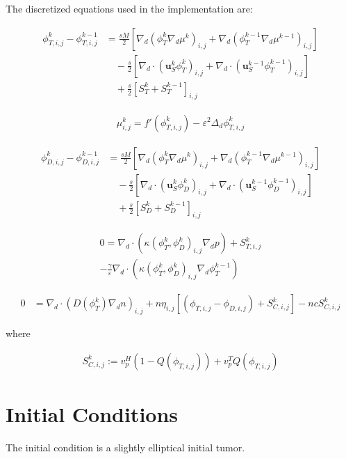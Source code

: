 \documentclass[12pt]{article}
\begin{document}
The discretized equations used in the implementation are:

\begin{align}
    \phi_{T,i,j}^{k} - \phi_{T,i,j}^{k-1} &= \frac{sM}{2} \left[\nabla_d (\phi_T^k \nabla_d \mu^k)_{i,j} + \nabla_d (\phi_T^{k-1} \nabla_d \mu^{k-1})_{i,j} \right] \nonumber \\
    &\quad - \frac{s}{2} \left[\nabla_d \cdot (\mathbf{u}_S^k \phi_T^k)_{i,j} + \nabla_d \cdot (\mathbf{u}_S^{k-1} \phi_T^{k-1})_{i,j} \right] \nonumber \\
    &\quad + \frac{s}{2} \left[S_T^{k} + S_T^{k-1} \right]_{i,j} 
\end{align}

\begin{align}
    \mu_{i,j}^{k} = f'(\phi_{T,i,j}^k) - \varepsilon^2 \Delta_d \phi_{T,i,j}^k 
\end{align}

\begin{align}
    \phi_{D,i,j}^{k} - \phi_{D,i,j}^{k-1} &= \frac{sM}{2} \left[\nabla_d (\phi_T^k \nabla_d \mu^k)_{i,j} + \nabla_d (\phi_T^{k-1} \nabla_d \mu^{k-1})_{i,j} \right] \nonumber \\
    &\quad - \frac{s}{2} \left[\nabla_d \cdot (\mathbf{u}_S^k \phi_D^k)_{i,j} + \nabla_d \cdot (\mathbf{u}_S^{k-1} \phi_D^{k-1})_{i,j} \right] \nonumber \\
    &\quad + \frac{s}{2} \left[S_D^{k} + S_D^{k-1} \right]_{i,j} 
\end{align}

\begin{align}
    0 = \nabla_d \cdot \left(\kappa(\phi_T^k, \phi_D^k)_{i,j} \nabla_d p \right) + S_{T,i,j}^{k} \nonumber \\
    - \frac{\gamma}{\varepsilon} \nabla_d \cdot \left( \kappa(\phi_T^k, \phi_D^k)_{i,j} \nabla_d \phi_T^{k-1} \right) 
\end{align}

\begin{align}
    0 &= \nabla_d \cdot \left( D(\phi_T^k) \nabla_d n \right)_{i,j} + n \eta_{i,j} \left[ (\phi_{T,i,j} - \phi_{D,i,j}) + S_{C,i,j}^k \right] - n c S_{C,i,j}^k 
\end{align}

where

\begin{align}
    S_{C,i,j}^k := v_p^H (1 - Q(\phi_{T,i,j})) + v_p^T Q(\phi_{T,i,j}) 
\end{align}

\section*{Initial Conditions}
The initial condition is a slightly elliptical initial tumor.
 
\end{document}
